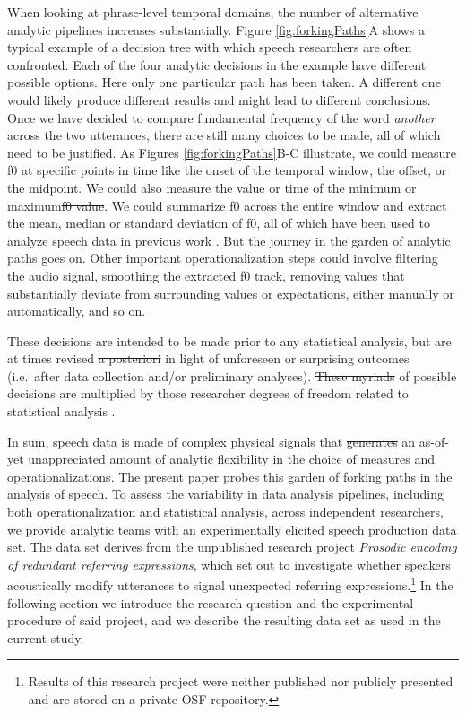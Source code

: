 \documentclass[Review,times,sageh]{sagej}
\providecommand{\DIFaddtex}[1]{{\protect\color{blue}\uwave{#1}}} %
\providecommand{\DIFdeltex}[1]{{\protect\color{red}\sout{#1}}}                      %
\providecommand{\DIFaddbegin}{} %
\providecommand{\DIFaddend}{} %
\providecommand{\DIFdelbegin}{} %
\providecommand{\DIFdelend}{} %
\providecommand{\DIFadd}[1]{\texorpdfstring{\DIFaddtex{#1}}{#1}} %
\providecommand{\DIFdel}[1]{\texorpdfstring{\DIFdeltex{#1}}{}} %
\begin{document}
When looking at phrase-level temporal domains, the number of \DIFaddbegin \DIFadd{possible }\DIFaddend alternative analytic pipelines increases substantially.
Figure \ref{fig:forkingPaths}A shows a typical example of a decision tree with which speech researchers are often confronted.
Each of the four analytic decisions in the example have different possible options.
Here only one particular path has been taken. A different one would likely produce different results and might lead to different conclusions.
Once we have decided to compare \DIFdelbegin \DIFdel{fundamental frequency }\DIFdelend \DIFaddbegin \DIFadd{f0 }\DIFaddend of the word \emph{another} across the two utterances, there are still many choices to be made, all of which need to be justified.
As Figures \ref{fig:forkingPaths}B-C illustrate, we could measure f0 at specific points in time like the onset of the temporal window, the offset, or the midpoint.
We could also measure the value or time of the \DIFaddbegin \DIFadd{f0 }\DIFaddend minimum or maximum\DIFdelbegin \DIFdel{f0 value}\DIFdelend .
We could summarize f0 across the entire window and extract the mean, median or standard deviation of f0, all of which have been used to analyze speech data in previous work \citep[see][]{gordon2017acoustic}.
But the journey in the garden of analytic paths goes on.
Other important operationalization steps could involve filtering the audio signal, smoothing the extracted f0 track, removing values that substantially deviate from surrounding values or expectations, either manually or automatically, and so on.

These decisions are intended to be made prior to any statistical analysis, but are at times revised \DIFdelbegin \DIFdel{a posteriori }\DIFdelend \DIFaddbegin \emph{\DIFadd{a posteriori}} \DIFaddend in light of unforeseen or surprising outcomes (i.e.~after data collection and/or preliminary analyses).
\DIFdelbegin \DIFdel{These myriads }\DIFdelend \DIFaddbegin \DIFadd{This multitude }\DIFaddend of possible decisions are multiplied by those researcher degrees of freedom related to statistical analysis \citep[e.g.][]{wicherts2016}.

In sum, speech data is made of complex physical signals that \DIFdelbegin \DIFdel{generates }\DIFdelend \DIFaddbegin \DIFadd{generate }\DIFaddend an as-of-yet unappreciated amount of analytic flexibility in the choice of measures and operationalizations.
The present paper probes this garden of forking paths in the analysis of speech.
To assess the variability in data analysis pipelines, including both operationalization and statistical analysis, across independent researchers, we provide analytic teams with an experimentally elicited speech production data set.
The data set derives from the unpublished research project \emph{Prosodic encoding of redundant referring expressions}, which set out to investigate whether speakers acoustically modify utterances to signal unexpected referring expressions.\footnote{Results of this research project were neither published nor publicly presented and are stored on a private OSF repository.}
In the following section we introduce the research question and the experimental procedure of said project, and we describe the resulting data set as used in the current study.
\end{document}
